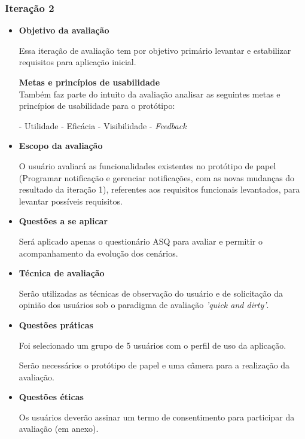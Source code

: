 	\subsubsection{Iteração 2}
	  
	  \begin{itemize}
	  
	   \item \textbf{Objetivo da avaliação}
	      
	      \subitem Essa iteração de avaliação tem por objetivo primário levantar e estabilizar
		requisitos para aplicação inicial.
	      
	      \subitem \textbf{Metas e princípios de usabilidade}\\
		Também faz parte do intuito da avaliação analisar as seguintes metas e princípios de usabilidade para o protótipo:
		
		\subsubitem - Utilidade
		\subsubitem - Eficácia
		\subsubitem - Visibilidade
		\subsubitem - \textit{Feedback}
	    
	   \item \textbf{Escopo da avaliação}
	      
	      \subitem 
		O usuário avaliará as funcionalidades existentes no protótipo de papel 
		(Programar notificação e gerenciar notificações, com as novas mudanças do resultado da iteração 1),
		referentes aos requisitos funcionais levantados, para levantar possíveis requisitos.
	      
	   \item \textbf{Questões a se aplicar}
	      
	      \subitem Será aplicado apenas o questionário ASQ para avaliar e permitir o acompanhamento da evolução dos cenários.
	      
	   \item \textbf{Técnica de avaliação}
	      
	      \subitem 
		Serão utilizadas as técnicas de observação do usuário e de solicitação da opinião dos usuários
		sob o paradigma de avaliação \textit{'quick and dirty'}.
	      
	   \item \textbf{Questões práticas}
	      
	      \subitem Foi selecionado um grupo de 5 usuários com o perfil de uso da aplicação.
	      
	      \subitem Serão necessários o protótipo de papel e uma câmera para a realização da avaliação.
	      
	   \item \textbf{Questões éticas}
	      
	      \subitem 
		Os usuários deverão assinar um termo de consentimento para participar da avaliação (em anexo).
	   
	  \end{itemize}
      
	